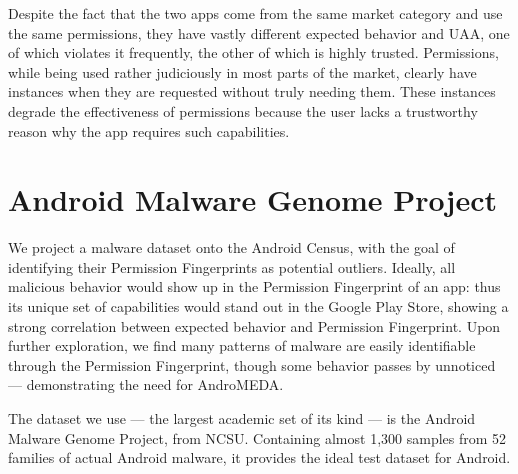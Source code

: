 Despite the fact that the two apps come from the same market category and use the same permissions, they have vastly different expected behavior and UAA, one of which violates it frequently, the other of which is highly trusted. Permissions, while being used rather judiciously in most parts of the market, clearly have instances when they are requested without truly needing them. These instances degrade the effectiveness of permissions because the user lacks a trustworthy reason why the app requires such capabilities.







\section{Android Malware Genome Project}
We project a malware dataset onto the Android Census, with the goal of identifying their Permission Fingerprints as potential outliers. Ideally, all malicious behavior would show up in the Permission Fingerprint of an app: thus its unique set of capabilities would stand out in the Google Play Store, showing a strong correlation between expected behavior and Permission Fingerprint. Upon further exploration, we find many patterns of malware are easily identifiable through the Permission Fingerprint, though some behavior passes by unnoticed --- demonstrating the need for AndroMEDA.

The dataset we use --- the largest academic set of its kind --- is the Android Malware Genome Project\citep{zhou2012dissecting}, from NCSU. Containing almost 1,300 samples from 52 families of actual Android malware, it provides the ideal test dataset for Android. 

